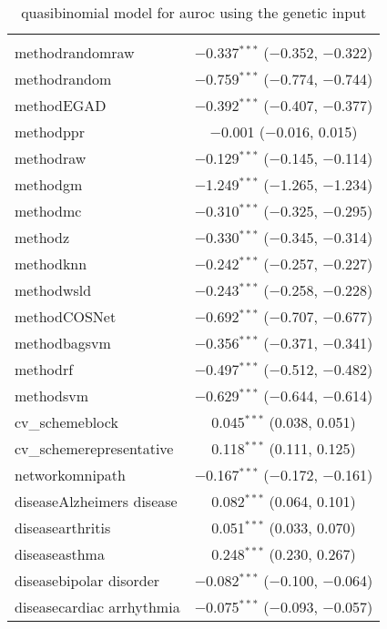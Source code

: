 
\begin{table}[!htbp] \centering 
  \caption{quasibinomial model for auroc using the genetic input} 
  \label{} 
\begin{tabular}{@{\extracolsep{5pt}}lc} 
\\[-1.8ex]\hline 
\hline \\[-1.8ex] 
 methodrandomraw & $-$0.337$^{***}$ ($-$0.352, $-$0.322) \\ 
  methodrandom & $-$0.759$^{***}$ ($-$0.774, $-$0.744) \\ 
  methodEGAD & $-$0.392$^{***}$ ($-$0.407, $-$0.377) \\ 
  methodppr & $-$0.001 ($-$0.016, 0.015) \\ 
  methodraw & $-$0.129$^{***}$ ($-$0.145, $-$0.114) \\ 
  methodgm & $-$1.249$^{***}$ ($-$1.265, $-$1.234) \\ 
  methodmc & $-$0.310$^{***}$ ($-$0.325, $-$0.295) \\ 
  methodz & $-$0.330$^{***}$ ($-$0.345, $-$0.314) \\ 
  methodknn & $-$0.242$^{***}$ ($-$0.257, $-$0.227) \\ 
  methodwsld & $-$0.243$^{***}$ ($-$0.258, $-$0.228) \\ 
  methodCOSNet & $-$0.692$^{***}$ ($-$0.707, $-$0.677) \\ 
  methodbagsvm & $-$0.356$^{***}$ ($-$0.371, $-$0.341) \\ 
  methodrf & $-$0.497$^{***}$ ($-$0.512, $-$0.482) \\ 
  methodsvm & $-$0.629$^{***}$ ($-$0.644, $-$0.614) \\ 
  cv\_schemeblock & 0.045$^{***}$ (0.038, 0.051) \\ 
  cv\_schemerepresentative & 0.118$^{***}$ (0.111, 0.125) \\ 
  networkomnipath & $-$0.167$^{***}$ ($-$0.172, $-$0.161) \\ 
  diseaseAlzheimers disease & 0.082$^{***}$ (0.064, 0.101) \\ 
  diseasearthritis & 0.051$^{***}$ (0.033, 0.070) \\ 
  diseaseasthma & 0.248$^{***}$ (0.230, 0.267) \\ 
  diseasebipolar disorder & $-$0.082$^{***}$ ($-$0.100, $-$0.064) \\ 
  diseasecardiac arrhythmia & $-$0.075$^{***}$ ($-$0.093, $-$0.057) \\ 

\end{tabular}
\end{table}
